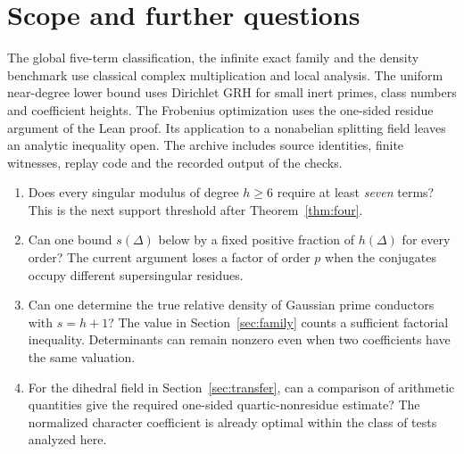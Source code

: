 \section{Scope and further questions}
The global five-term classification, the infinite exact family and the density benchmark use classical complex multiplication and local analysis. The uniform near-degree lower bound uses Dirichlet GRH for small inert primes, class numbers and coefficient heights. The Frobenius optimization uses the one-sided residue argument of the Lean proof. Its application to a nonabelian splitting field leaves an analytic inequality open. The archive includes source identities, finite witnesses, replay code and the recorded output of the checks.

\begin{enumerate}
\item Does every singular modulus of degree $h\ge6$ require at least \emph{seven} terms? This is the next support threshold after Theorem~\ref{thm:four}.
\item Can one bound $s(\Delta)$ below by a fixed positive fraction of $h(\Delta)$ for every order? The current argument loses a factor of order $p$ when the conjugates occupy different supersingular residues.
\item Can one determine the true relative density of Gaussian prime conductors with $s=h+1$? The value in Section~\ref{sec:family} counts a sufficient factorial inequality. Determinants can remain nonzero even when two coefficients have the same valuation.
\item For the dihedral field in Section~\ref{sec:transfer}, can a comparison of arithmetic quantities give the required one-sided quartic-nonresidue estimate? The normalized character coefficient is already optimal within the class of tests analyzed here.
\end{enumerate}

\appendix
